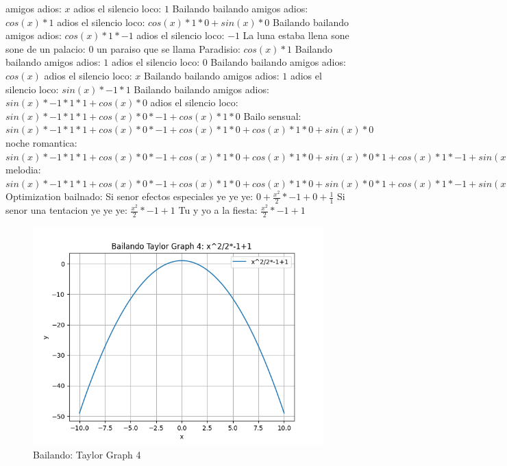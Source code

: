 \documentclass{article}
\begin{document}
amigos adios: $x$ adios el silencio loco: $1$  \newline Bailando bailando amigos adios: $cos(x)*1$ adios el silencio loco: $cos(x)*1*0+sin(x)*0$ Bailando bailando amigos adios: $cos(x)*1*-1$ adios el silencio loco: $-1$ La luna estaba llena sone sone de un palacio: $0$  \newline un paraiso que se llama Paradisio: $cos(x)*1$ Bailando bailando amigos adios: $1$ adios el silencio loco: $0$  \newline Bailando bailando amigos adios: $cos(x)$  \newline adios el silencio loco: $x$ Bailando bailando amigos adios: $1$  \newline adios el silencio loco: $sin(x)*-1*1$ Bailando bailando amigos adios: $sin(x)*-1*1*1+cos(x)*0$ adios el silencio loco: ${sin(x)*-1*1*1+cos(x)*0}*-1+cos(x)*1*0$ Bailo sensual: ${sin(x)*-1*1*1+cos(x)*0}*-1+cos(x)*1*0+cos(x)*1*0+sin(x)*0$ noche romantica: ${{sin(x)*-1*1*1+cos(x)*0}*-1+cos(x)*1*0+cos(x)*1*0+sin(x)*0}*1+{cos(x)*1*-1+sin(x)*0}*0$ melodia: ${{sin(x)*-1*1*1+cos(x)*0}*-1+cos(x)*1*0+cos(x)*1*0+sin(x)*0}*1+{cos(x)*1*-1+sin(x)*0}*0+{cos(x)*1*-1+sin(x)*0}*0+sin(x)*-1*0$  \newline \newline Optimization bailnado: \newline Si senor efectos especiales ye ye ye: $0+\frac{x^2}{2}*-1+0+\frac{1}{1}$  \newline Si senor una tentacion ye ye ye: $\frac{x^2}{2}*-1+1$  \newline Tu y yo a la fiesta: $\frac{x^2}{2}*-1+1$  \newline \begin{figure}
\centering
\includegraphics[width=0.8\linewidth]{Bailando Taylor Graph 4.png}
\caption{Bailando: Taylor Graph 4}
\label{fig:my_image}
\end{figure}
\end{document}
